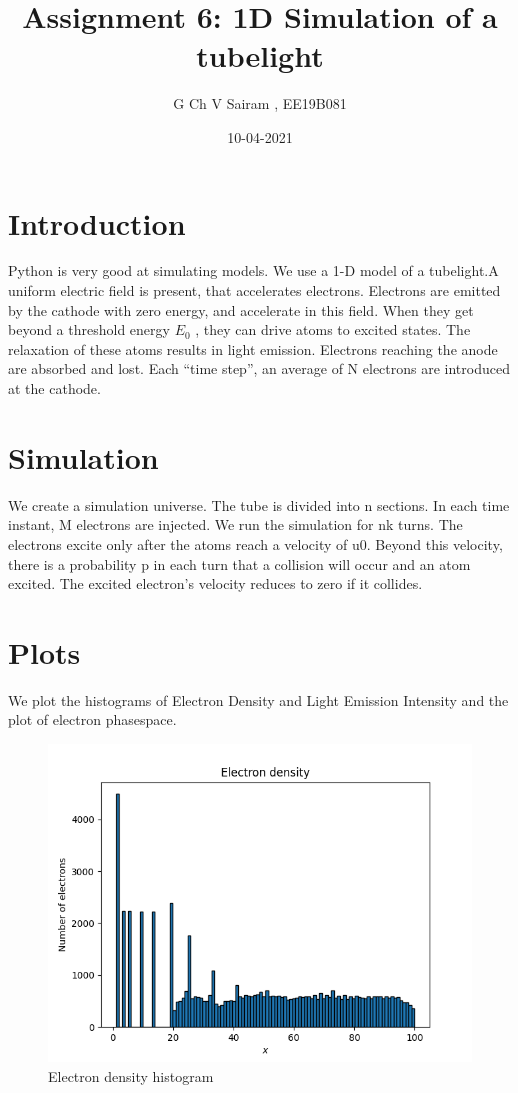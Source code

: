 \documentclass[11pt, a4paper]{article}
\title{Assignment 6: 1D Simulation of a tubelight}
\author{G Ch V Sairam , EE19B081}
\date{10-04-2021}
\begin{document}
		
		
\maketitle
\section*{Introduction}
Python is very good at simulating models. We use a 1-D model of a tubelight.A uniform electric field is present, that accelerates electrons. Electrons are emitted by the cathode with zero energy, and accelerate in this field. When they get beyond a threshold energy $E_0$ , they can drive atoms to excited states. The relaxation of these atoms results in light emission. Electrons reaching the anode are absorbed and lost. Each “time step”, an average of N electrons are introduced at the cathode.

\section*{Simulation}
We create a simulation universe. The tube is divided into n sections. In each time instant, M electrons are injected. We run the simulation for nk turns. The electrons excite only after the atoms reach a velocity of u0. Beyond this velocity, there is a probability p in each turn that a collision will occur and an atom excited. The excited electron’s velocity reduces to zero if it collides.



\section*{Plots}
We plot the histograms of Electron Density and Light Emission Intensity and the plot of electron phasespace.

\begin{figure}[!tbh]
\centering
\includegraphics[scale=0.75]{assn6_plot0.png} 
\caption{Electron density histogram}
\label{fig0}
\end{figure}
\end{document}
